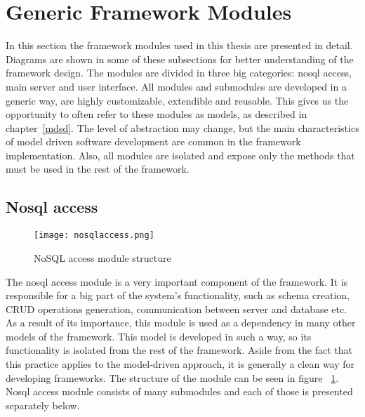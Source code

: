 \section{Generic Framework Modules}
In this section the framework modules used in this thesis are presented in detail. Diagrams are shown in some of these subsections for better understanding of the framework design. The modules are divided in three big categories: nosql access, main server and user interface. All modules and submodules are developed in a generic way, are highly customizable, extendible and reusable. This gives us the opportunity to often refer to these modules as models, as described in chapter~\ref{mdsd}. The level of abstraction may change, but the main characteristics of model driven software development are common in the framework implementation. Also, all modules are isolated and expose only the methods that must be used in the rest of the framework.


\subsection{Nosql access}
\label{nosql}
\begin{figure}
	\texttt{[image: nosqlaccess.png]}
	\caption{NoSQL access module structure}
	\label{nosqlaccess}
\end{figure}
The nosql access module is a very important component of the framework. It is responsible for a big part of the system's functionality, such as schema creation, CRUD operations generation, communication between server and database etc. As a result of its importance, this module is used as a dependency in many other models of the framework. This model is developed in such a way, so its functionality is isolated from the rest of the framework. Aside from the fact that this practice applies to the model-driven approach, it is generally a clean way for developing frameworks. The structure of the module can be seen in figure ~\ref{nosqlaccess}. Nosql access module consists of many submodules and each of those is presented separately below. 

